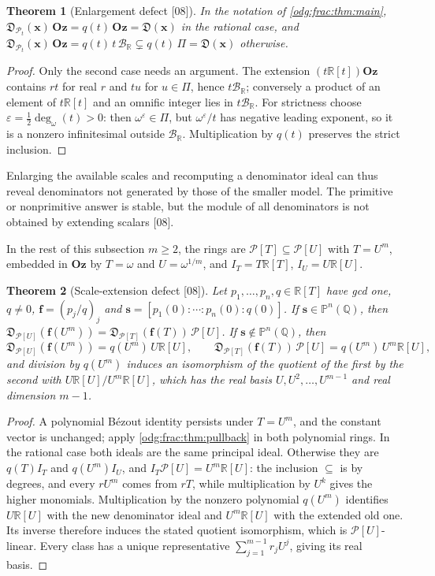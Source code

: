 \documentclass[11pt,oneside]{article}
\numberwithin{equation}{section}
\newtheorem{theorem}{Theorem}[section]
\theoremstyle{definition}
\theoremstyle{remark}
\newcommand{\Oz}{\mathbf{Oz}}
\newcommand{\Q}{\mathbb Q}
\newcommand{\R}{\mathbb R}
\newcommand{\BR}{\mathcal B_{\R}}
\newcommand{\ddeg}{\operatorname{deg}_{\omega}}
\newcommand{\src}[1]{\textup{\textsf{\small[#1]}}}
\newcommand{\Den}{\mathfrak D}
\newcommand{\Pmod}{\mathcal P}
\begin{document}
\begin{theorem}[Enlargement defect \src{08}]\label{odg:frac:thm:enlargement}
In the notation of \cref{odg:frac:thm:main},
$\Den_{\Pmod_t}(\mathbf x)\,\Oz=q(t)\,\Oz=\Den(\mathbf x)$ in the rational case,
and $\Den_{\Pmod_t}(\mathbf x)\,\Oz=q(t)\,t\,\BR\subsetneq q(t)\,\Pi=\Den(\mathbf x)$
otherwise.
\end{theorem}
\begin{proof}
Only the second case needs an argument. The extension $(t\R[t])\Oz$ contains $rt$
for real $r$ and $tu$ for $u\in\Pi$, hence $t\BR$; conversely a product of an
element of $t\R[t]$ and an omnific integer lies in $t\BR$. For strictness choose
$\varepsilon=\tfrac12\ddeg(t)>0$: then $\omega^\varepsilon\in\Pi$, but
$\omega^\varepsilon/t$ has negative leading exponent, so it is a nonzero
infinitesimal outside $\BR$. Multiplication by $q(t)$ preserves the strict
inclusion.
\end{proof}

Enlarging the available scales and recomputing a denominator ideal can thus
reveal denominators not generated by those of the smaller model. The primitive
or nonprimitive answer is stable, but the module of all denominators is not
obtained by extending scalars \src{08}.

In the rest of this subsection $m\ge2$, the rings are $\Pmod[T]\subseteq\Pmod[U]$
with $T=U^m$, embedded in $\Oz$ by $T=\omega$ and $U=\omega^{1/m}$, and
$I_T=T\R[T]$, $I_U=U\R[U]$.

\begin{theorem}[Scale-extension defect \src{08}]\label{odg:frac:thm:scale}
Let $p_1,\ldots,p_n,q\in\R[T]$ have gcd one, $q\ne0$, $\mathbf f=(p_j/q)_j$ and
$\mathbf s=[p_1(0):\cdots:p_n(0):q(0)]$. If $\mathbf s\in\mathbb P^n(\Q)$, then
$\Den_{\Pmod[U]}(\mathbf f(U^m))=\Den_{\Pmod[T]}(\mathbf f(T))\,\Pmod[U]$. If
$\mathbf s\notin\mathbb P^n(\Q)$, then
\[
 \Den_{\Pmod[U]}(\mathbf f(U^m))=q(U^m)\,U\R[U],\qquad
 \Den_{\Pmod[T]}(\mathbf f(T))\,\Pmod[U]=q(U^m)\,U^m\R[U],
\]
and division by $q(U^m)$ induces an isomorphism of the quotient of the first by
the second with $U\R[U]/U^m\R[U]$, which has the real basis
$U,U^2,\ldots,U^{m-1}$ and real dimension $m-1$.
\end{theorem}
\begin{proof}
A polynomial B\'ezout identity persists under $T=U^m$, and the constant vector is
unchanged; apply \cref{odg:frac:thm:pullback} in both polynomial rings. In the
rational case both ideals are the same principal ideal. Otherwise they are
$q(T)I_T$ and $q(U^m)I_U$, and $I_T\Pmod[U]=U^m\R[U]$: the inclusion $\subseteq$ is
by degrees, and every $rU^m$ comes from $rT$, while multiplication by $U^k$ gives
the higher monomials. Multiplication by the nonzero polynomial $q(U^m)$
identifies $U\R[U]$ with the new denominator ideal and $U^m\R[U]$ with
the extended old one. Its inverse therefore induces the stated quotient
isomorphism, which is $\Pmod[U]$-linear. Every class has a unique
representative $\sum_{j=1}^{m-1}r_jU^j$, giving its real basis.
\end{proof}
\end{document}

